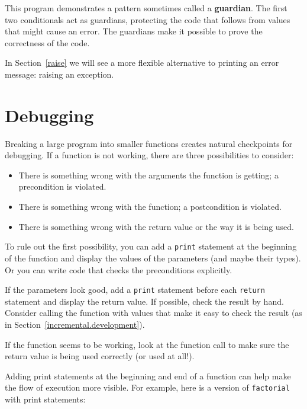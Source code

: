 \documentclass[10pt]{book}
\begin{document}
This program demonstrates a pattern sometimes called a {\bf guardian}.
The first two conditionals act as guardians, protecting the code that
follows from values that might cause an error.  The guardians make it
possible to prove the correctness of the code.

In Section~\ref{raise} we will see a more flexible alternative to printing
an error message: raising an exception.


\section{Debugging}
\label{factdebug}

Breaking a large program into smaller functions creates natural
checkpoints for debugging.  If a function is not
working, there are three possibilities to consider:

\begin{itemize}

\item There is something wrong with the arguments the function
is getting; a precondition is violated.

\item There is something wrong with the function; a postcondition
is violated.

\item There is something wrong with the return value or the
way it is being used.

\end{itemize}

To rule out the first possibility, you can add a {\tt print} statement
at the beginning of the function and display the values of the
parameters (and maybe their types).  Or you can write code
that checks the preconditions explicitly.

If the parameters look good, add a {\tt print} statement before each
{\tt return} statement and display the return value.  If
possible, check the result by hand.  Consider calling the
function with values that make it easy to check the result
(as in Section~\ref{incremental.development}).

If the function seems to be working, look at the function call
to make sure the return value is being used correctly (or used
at all!).

Adding print statements at the beginning and end of a function
can help make the flow of execution more visible.
For example, here is a version of {\tt factorial} with
print statements:
\end{document}

